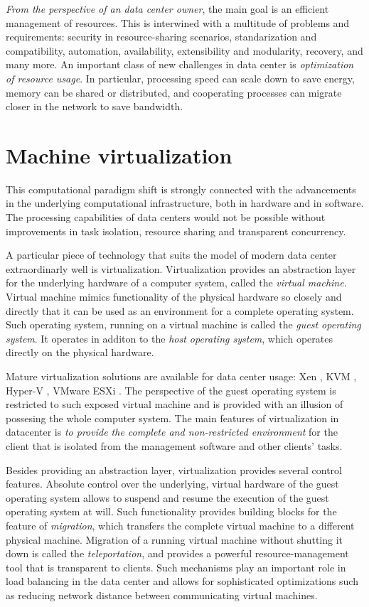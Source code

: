 \emph{From the perspective of an data center owner}, the main goal 
is an efficient management of resources. This is interwined with 
a multitude of problems and requirements: security in resource-sharing scenarios,
standarization and compatibility, automation, availability, extensibility and
modularity, recovery, and many more. An important class of new challenges in
data center is \emph{optimization of resource usage}. In particular, 
processing speed can
scale down to save energy, memory can be shared or distributed, and cooperating
processes can migrate closer in the network to save bandwidth.

\section{Machine virtualization}

This computational paradigm shift is strongly connected with the advancements 
in the underlying computational infrastructure, both in hardware and in software. 
The processing capabilities of data centers 
would not be possible without improvements in
task isolation, resource sharing and transparent concurrency.

A particular piece of technology that suits the model of modern data center extraordinarly well is virtualization.
Virtualization provides an abstraction layer for the underlying hardware of a computer system, called the \emph{virtual machine}.
Virtual machine mimics functionality of the physical hardware so closely and
directly that it can be used as an environment for a complete operating system.
Such operating system, running on a virtual machine is called the \emph{guest
operating system}. It operates in additon to the \emph{host operating
system}, which operates directly on the physical hardware. 

Mature virtualization solutions are available for data center usage: Xen
\cite{url-xen}, KVM \cite{url-kvm}, Hyper-V \cite{url-hyperv}, VMware ESXi
\cite{url-vmware}. The perspective of the guest
operating system is restricted to such exposed virtual machine and is provided
with an illusion of possesing the whole computer system. The main features of
virtualization in datacenter is \emph{to provide the complete and
non-restricted environment} for the client that is isolated from the management
software and other clients' tasks.

Besides providing an abstraction layer, virtualization provides several control features.
Absolute control over the underlying, virtual hardware of the guest operating system allows to suspend and resume the execution of the guest operating system at will.
Such functionality provides building blocks for the feature of \emph{migration}, which transfers the complete virtual machine to a different physical machine.
Migration of a running virtual machine without shutting it down is called the \emph{teleportation}, and provides a powerful resource-management tool that is transparent to clients.
Such mechanisms play an important role in load balancing in the data center and allows for sophisticated optimizations such as reducing network distance between communicating virtual machines.

